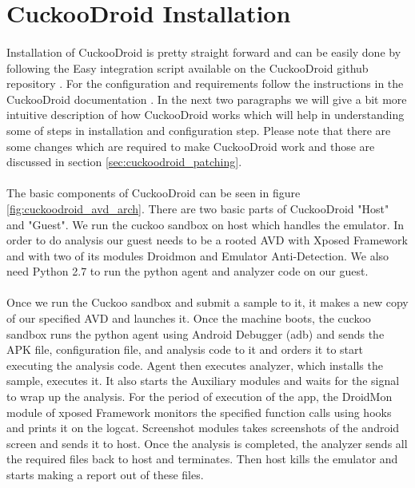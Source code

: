 \documentclass[../main.tex]{subfile}
\begin{document}
		\section{CuckooDroid Installation}\label{sec:cuckoodroid_installation}
		\paragraph{} Installation of CuckooDroid is pretty straight forward and can be easily done by following the Easy integration script available on the CuckooDroid github repository \cite{cuckoodroid_github}. For the configuration and requirements follow the instructions in the CuckooDroid documentation \cite{cuckoodroid_docs}. In the next two paragraphs we will give a bit more intuitive description of how CuckooDroid works which will help in understanding some of steps in installation and configuration step. Please note that there are some changes which are required to make CuckooDroid work and those are discussed in section \ref{sec:cuckoodroid_patching}.
		\paragraph{} The basic components of CuckooDroid can be seen in figure \ref{fig:cuckoodroid_avd_arch}. There are two basic parts of CuckooDroid "Host" and "Guest". We run the cuckoo sandbox on host which handles the emulator. In order to do analysis our guest needs to be a rooted AVD with Xposed Framework \cite{xposed_module_repo} and with two of its modules Droidmon and Emulator Anti-Detection. We also need Python 2.7 to run the python agent and analyzer code on our guest.
		\paragraph{} Once we run the Cuckoo sandbox and submit a sample to it, it makes a new copy of our specified AVD and launches it. Once the machine boots, the cuckoo sandbox runs the python agent using Android Debugger (adb) and sends the APK file, configuration file, and analysis code to it and orders it to start executing the analysis code. Agent then executes analyzer, which installs the sample, executes it. It also starts the Auxiliary modules and waits for the signal to wrap up the analysis. For the period of execution of the app, the DroidMon module of xposed Framework monitors the specified function calls using hooks and prints it on the logcat. Screenshot modules takes screenshots of the android screen and sends it to host. Once the analysis is completed, the analyzer sends all the required files back to host and terminates. Then host kills the emulator and starts making a report out of these files.
\end{document}
